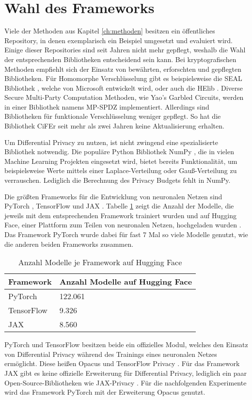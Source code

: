 \section{Wahl des Frameworks}

Viele der Methoden aus Kapitel \ref{ch:methoden} besitzen ein öffentliches Repository, in denen exemplarisch ein Beispiel umgesetzt und evaluiert wird.
Einige dieser Repositories sind seit Jahren nicht mehr gepflegt, weshalb die Wahl der entsprechenden Bibliotheken entscheidend sein kann.
Bei kryptografischen Methoden empfiehlt sich der Einsatz von bewährten, erforschten und gepflegten Bibliotheken.
Für Homomorphe Verschlüsselung gibt es beispielsweise die SEAL Bibliothek \cite{SEAL}, welche von Microsoft entwickelt wird, oder auch die HElib \cite{helib}.
Diverse Secure Multi-Party Computation Methoden, wie Yao's Garbled Circuits, werden in einer Bibliothek namens MP-SPDZ \cite{mp-spdz} implementiert.
Allerdings sind Bibliotheken für funktionale Verschlüsselung weniger gepflegt. So hat die Bibliothek CiFEr \cite{cifer} seit mehr als zwei Jahren keine Aktualisierung erhalten.

Um Differential Privacy zu nutzen, ist nicht zwingend eine spezialisierte Bibliothek notwendig. 
Die populäre Python Bibliothek NumPy \cite{numpy}, die in vielen Machine Learning Projekten eingesetzt wird, bietet bereits Funktionalität, um beispielsweise Werte mittels einer Laplace-Verteilung oder Gauß-Verteilung zu verrauschen.
Lediglich die Berechnung des Privacy Budgets fehlt in NumPy.

Die größten Frameworks für die Entwicklung von neuronalen Netzen sind PyTorch \cite{pytorch}, TensorFlow \cite{tensorflow} und JAX \cite{jax}. 
Tabelle \ref{tab:framworks} zeigt die Anzahl der Modelle, die jeweils mit dem entsprechenden Framework trainiert wurden und auf Hugging Face, einer Plattform zum Teilen von neuronalen Netzen, hochgeladen wurden \cite{HuggingFace}.
Das Framework PyTorch wurde dabei für fast 7 Mal so viele Modelle genutzt, wie die anderen beiden Frameworks zusammen.
\begin{table}[!htb]
\centering
\begin{tabular}{|l|l|}
\hline
\rowcolor[HTML]{CBCEFB} 
{\color[HTML]{000000} Framework} & Anzahl Modelle auf Hugging Face     \\ \hline
PyTorch & 122.061          \\ \hline
TensorFlow & 9.326             \\ \hline
JAX  & 8.560          \\ \hline

\end{tabular}
\caption{Anzahl Modelle je Framework auf Hugging Face \cite{HuggingFace}}
\label{tab:framworks}
\end{table}

PyTorch und TensorFlow besitzen beide ein offizielles Modul, welches den Einsatz von Differential Privacy während des Trainings eines neuronalen Netzes ermöglicht. 
Diese heißen Opacus \cite{opacus} und TensorFlow Privacy \cite{Tensorflowprivacy}.
Für das Framework JAX gibt es keine offizielle Erweiterung für Differential Privacy, lediglich ein paar Open-Source-Bibliotheken wie JAX-Privacy \cite{jaxprivacy}.
Für die nachfolgenden Experimente wird das Framework PyTorch mit der Erweiterung Opacus genutzt.